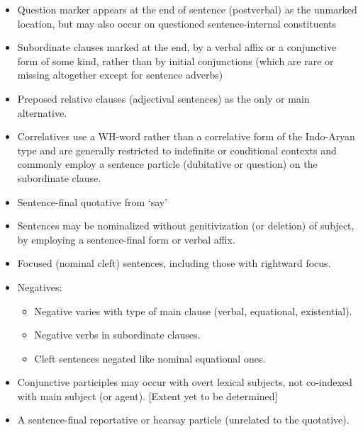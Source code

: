 \documentclass{article}
\begin{document}
\begin{itemize}
 \item Question marker appears at the end of sentence (postverbal) as the unmarked location, but may also occur on questioned sentence-internal constituents
 \item  Subordinate clauses marked at the end, by a verbal affix or a conjunctive form of some kind, rather than by initial conjunctions (which are rare or missing altogether except for sentence adverbs) 
 \item Preposed relative clauses (adjectival sentences) as the only or main alternative. 
 \item Correlatives use a WH-word rather than a correlative form of the Indo-Aryan type and are generally restricted to indefinite or conditional contexts and commonly employ a sentence particle (dubitative or question) on the subordinate clause. 
 \item  Sentence-final quotative from `say' 
 \item  Sentences may be nominalized without genitivization (or deletion) of subject, by employing a sentence-final form or verbal affix. 
 \item  Focused (nominal cleft) sentences, including those with rightward focus. 
 \item   Negatives: 
  \begin{itemize} 
    \item    Negative varies with type of main clause (verbal, equational, existential). 
    \item   Negative verbs in subordinate clauses. 
    \item   Cleft sentences negated like nominal equational ones. 
  \end{itemize}

 \item  Conjunctive participles may occur with overt lexical subjects, not co-indexed with main subject (or agent). [Extent yet to be determined] 
 \item A sentence-final reportative or hearsay particle (unrelated to the quotative). 
\end{itemize}
 
\end{document}
